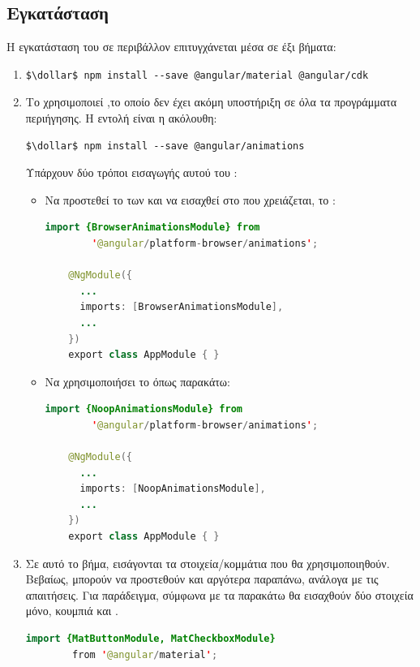 \subsection*{Εγκατάσταση}
\quad Η εγκατάσταση του σε περιβάλλον  επιτυγχάνεται μέσα σε έξι βήματα:
\begin{enumerate}[label=\textbf{\arabic*}]
    \item 
{}
\begin{lstlisting}[language=command.com]
  $\dollar$ npm install --save @angular/material @angular/cdk
\end{lstlisting}
    \item Το  χρησιμοποιεί ,το οποίο δεν έχει ακόμη υποστήριξη σε όλα τα προγράμματα περιήγησης. Η εντολή  είναι η ακόλουθη:   
\begin{lstlisting}[language=command.com]
  $\dollar$ npm install --save @angular/animations
\end{lstlisting}
Υπάρχουν δύο τρόποι εισαγωγής αυτού του :
    \begin{itemize}
        \item Να προστεθεί το  των  και να εισαχθεί στο  που χρειάζεται, το :
\begin{lstlisting}[language=Java]
    import {BrowserAnimationsModule} from 
        '@angular/platform-browser/animations';

    @NgModule({
      ...
      imports: [BrowserAnimationsModule],
      ...
    })
    export class AppModule { }
\end{lstlisting}
    \item  Να χρησιμοποιήσει το  όπως παρακάτω:  
\begin{lstlisting}[language=Java]
    import {NoopAnimationsModule} from 
        '@angular/platform-browser/animations';

    @NgModule({
      ...
      imports: [NoopAnimationsModule],
      ...
    })
    export class AppModule { }
\end{lstlisting}
    \end{itemize}
    \item Σε αυτό το βήμα, εισάγονται τα στοιχεία/κομμάτια που θα χρησιμοποιηθούν.
    Βεβαίως, μπορούν να προστεθούν και αργότερα παραπάνω, ανάλογα με τις απαιτήσεις.
    Για παράδειγμα, σύμφωνα με τα παρακάτω θα εισαχθούν δύο στοιχεία μόνο, κουμπιά και .
\begin{lstlisting}[language=Java]
   import {MatButtonModule, MatCheckboxModule} 
        from '@angular/material';


\end{lstlisting}
\end{enumerate}
